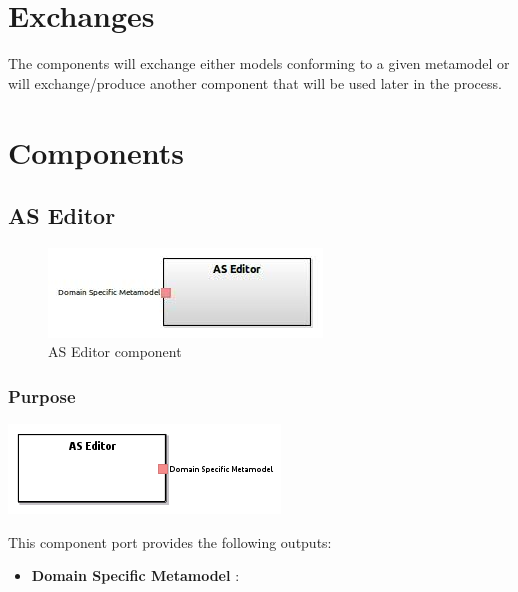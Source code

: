 \documentclass{gemoc} %
\begin{document}
\section{Exchanges}
The components will exchange either models conforming to a given metamodel or will exchange/produce another component that will be used later in the process.


\section{Components}

\subsection{AS Editor}

\begin{figure}[htp]
	\begin{center}
	\includegraphics*[trim=0.0cm 0.0cm 0cm 0.0cm, clip=true, scale=1.0]{../images/generated/Generated_AS Editor.jpg}
	\caption{AS Editor component}
	\end{center}
\end{figure}

\subsubsection{Purpose}

\begin{center}
\includegraphics*[trim=0.0cm 0.0cm 0cm 0.0cm, clip=true]{../images/generated/Generated_AS_Editor.png}
\end{center}


This component port provides the following outputs:
\begin{itemize}
  \item \textbf{Domain Specific Metamodel} :
\end{itemize}
\end{document}
